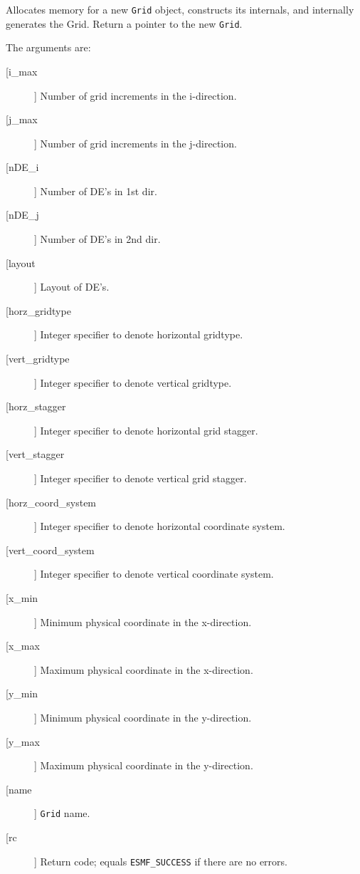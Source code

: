        Allocates memory for a new {\tt Grid} object, constructs its
       internals, and internally generates the Grid.  Return a pointer to
       the new {\tt Grid}.
  
       The arguments are:
       \begin{description}
       \item[[i\_max]]
            Number of grid increments in the i-direction.
       \item[[j\_max]]
            Number of grid increments in the j-direction.
       \item[[nDE\_i]]
            Number of DE's in 1st dir.
       \item[[nDE\_j]]
            Number of DE's in 2nd dir.
       \item[[layout]]
            Layout of DE's.
       \item[[horz\_gridtype]]
            Integer specifier to denote horizontal gridtype.
       \item[[vert\_gridtype]]
            Integer specifier to denote vertical gridtype.
       \item[[horz\_stagger]]
            Integer specifier to denote horizontal grid stagger.
       \item[[vert\_stagger]]
            Integer specifier to denote vertical grid stagger.
       \item[[horz\_coord\_system]]
            Integer specifier to denote horizontal coordinate system.
       \item[[vert\_coord\_system]]
            Integer specifier to denote vertical coordinate system.
       \item[[x\_min]]
            Minimum physical coordinate in the x-direction.
       \item[[x\_max]]
            Maximum physical coordinate in the x-direction.
       \item[[y\_min]]
            Minimum physical coordinate in the y-direction.
       \item[[y\_max]]
            Maximum physical coordinate in the y-direction.
       \item[[name]]
            {\tt Grid} name.
       \item[[rc]]
            Return code; equals {\tt ESMF\_SUCCESS} if there are no errors.
     \end{description}
  
\begin{verbatim} \end{verbatim}
 

